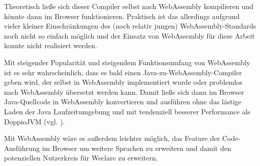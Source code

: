 Theoretisch ließe sich dieser Compiler selbst nach WebAssembly kompilieren und könnte dann im Browser funktionieren. Praktisch ist das allerdings aufgrund vieler kleiner Einschränkungen des (noch relativ jungen) WebAssembly-Standards noch nicht so einfach möglich und der Einsatz von WebAssembly für diese Arbeit konnte nicht realisiert werden.

Mit steigender Popularität und steigendem Funktionsumfang von WebAssembly ist es sehr wahrscheinlich, dass es bald einen Java-zu-WebAssembly-Compiler geben wird, der selbst in WebAssembly implementiert wurde oder problemlos nach WebAssembly übersetzt werden kann. Damit ließe sich dann im Browser Java-Quellcode in WebAssembly konvertieren und ausführen ohne das lästige Laden der Java Laufzeitumgebung und mit tendenziell besserer Performance als DoppioJVM (vgl. \cite{art:wasm_speed}).

Mit WebAssembly wäre es außerdem leichter möglich, das Feature der Code-Ausführung im Browser um weitere Sprachen zu erweitern und damit den potenziellen Nutzerkreis für Weclare zu erweitern.